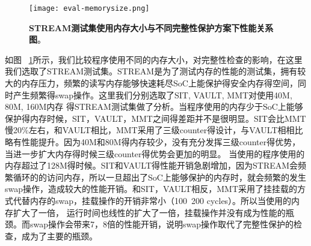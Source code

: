 \begin{figure}[!htp]
    \centering
    \texttt{[image: eval-memorysize.png]}
    \caption{\textbf{STREAM测试集使用内存大小与不同完整性保护方案下性能关系图}。}
   \label{fig:eval-memorysize}
\end{figure}
如图 ~\ref{fig:eval-memorysize}所示，我们比较程序使用不同的内存大小，对完整性检查的影响，在这里我们选取了STREAM测试集。STREAM是为了测试内存的性能的测试集，拥有较大的内存压力，频繁的读写内存能够快速耗尽SoC上能保护得安全内存得空间，同时产生频繁得swap操作。这里我们分别选取了SIT, VAULT, MMT对使用40M, 80M, 160M内存
得STREAM测试集做了分析。当程序使用的内存少于SoC上能够保护得内存时候，SIT，VAULT，MMT之间得差距并不是很明显。SIT会比MMT慢20\%左右，和VAULT相比，MMT采用了三级counter得设计，与VAULT相相比略有性能提升。因为40M和80M得内存较少，没有充分发挥三级counter得优势，当进一步扩大内存得时候三级counter得优势会更加的明显。
当使用的程序使用的内存超过了128M得时候。SIT和VAULT得性能开销急剧增加，因为STREAM会频繁循环的的访问内存，所以一旦超出了SoC上能够保护的内存时，就会频繁的发生swap操作，造成较大的性能开销。和SIT，VAULT相反，MMT采用了挂挂载的方式代替内存的swap，挂载操作的开销非常小（100~200 cycles）。所以当使用的内存扩大了一倍，
运行时间也线性的扩大了一倍，挂载操作并没有成为性能的瓶颈。而swap操作会带来7，8倍的性能开销，说明swap操作取代了完整性保护的检查，成为了主要的瓶颈。

